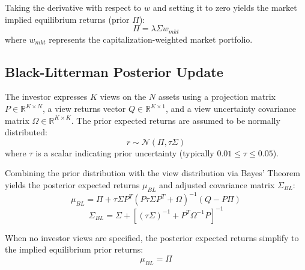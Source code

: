 \documentclass[11pt,a4paper]{article}
\begin{document}
Taking the derivative with respect to $w$ and setting it to zero yields the market implied equilibrium returns (prior $\Pi$):
\begin{equation}
\Pi = \lambda \Sigma w_{mkt}
\end{equation}
where $w_{mkt}$ represents the capitalization-weighted market portfolio.

\subsection{Black-Litterman Posterior Update}
The investor expresses $K$ views on the $N$ assets using a projection matrix $P \in \mathbb{R}^{K \times N}$, a view returns vector $Q \in \mathbb{R}^{K \times 1}$, and a view uncertainty covariance matrix $\Omega \in \mathbb{R}^{K \times K}$. The prior expected returns are assumed to be normally distributed:
\begin{equation}
r \sim \mathcal{N}(\Pi, \tau \Sigma)
\end{equation}
where $\tau$ is a scalar indicating prior uncertainty (typically $0.01 \le \tau \le 0.05$).

Combining the prior distribution with the view distribution via Bayes' Theorem yields the posterior expected returns $\mu_{BL}$ and adjusted covariance matrix $\Sigma_{BL}$:
\begin{equation}
\mu_{BL} = \Pi + \tau \Sigma P^T \left( P \tau \Sigma P^T + \Omega \right)^{-1} \left( Q - P \Pi \right)
\end{equation}
\begin{equation}
\Sigma_{BL} = \Sigma + \left[ \left( \tau \Sigma \right)^{-1} + P^T \Omega^{-1} P \right]^{-1}
\end{equation}

When no investor views are specified, the posterior expected returns simplify to the implied equilibrium prior returns:
\begin{equation}
\mu_{BL} = \Pi
\end{equation}
\end{document}
